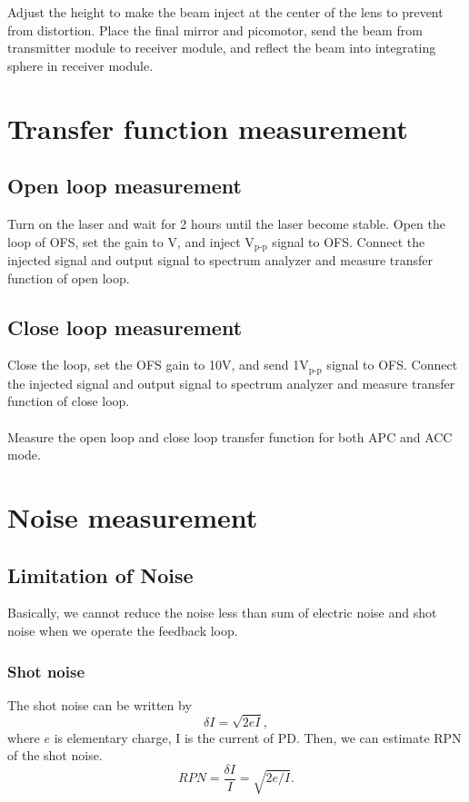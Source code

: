 

Adjust the height to make the beam inject at the center of the lens to prevent from distortion. Place the final mirror and picomotor, send the beam from transmitter module to receiver module, and reflect the beam into integrating sphere in receiver module.

\section{Transfer function measurement}
\subsection{Open loop measurement}
Turn on the laser and wait for 2 hours until the laser become stable. Open the loop of OFS, set the gain to \underline{\qquad} V, and inject \underline{\qquad} $\mbox{V}_{\mbox{p-p}}$ signal to OFS. Connect the injected signal and output signal to spectrum analyzer and measure transfer function of open loop.
\subsection{Close loop measurement}
Close the loop, set the OFS gain to 10V, and send 1$\mbox{V}_{\mbox{p-p}}$ signal to OFS. Connect the injected signal and output signal to spectrum analyzer and measure transfer function of close loop.
\\\\
\noindent Measure the open loop and close loop transfer function for both APC and ACC mode.

\section{Noise measurement}
\subsection{Limitation of Noise}
Basically, we cannot reduce the noise less than sum of electric noise and shot noise when we operate the feedback loop.
\subsubsection{Shot noise}
The shot noise can be written by
\begin{equation}
\delta I=\sqrt{2eI},
\end{equation}
where $e$ is elementary charge, I is the current of PD. Then, we can estimate RPN of the shot noise.
\begin{equation}
RPN=\frac{\delta I}{I}=\sqrt{2e/I}.
\end{equation}

